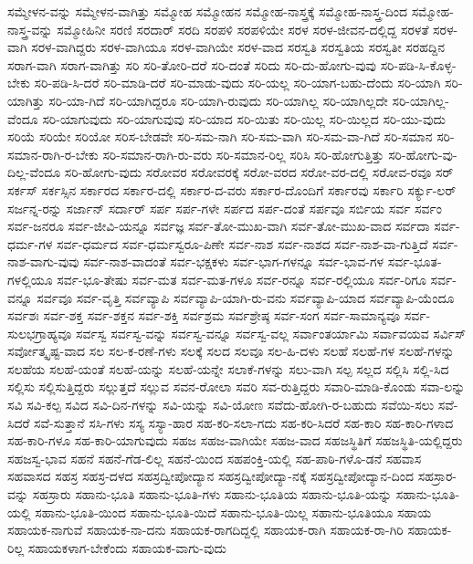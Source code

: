 {ಸಮ್ಮೇಳನ-ವನ್ನು
ಸಮ್ಮೇಳನ-ವಾಗಿತ್ತು
ಸಮ್ಮೋಹ
ಸಮ್ಮೋಹನ
ಸಮ್ಮೋಹ-ನಾಸ್ತ್ರಕ್ಕೆ
ಸಮ್ಮೋಹ-ನಾಸ್ತ್ರ-ದಿಂದ
ಸಮ್ಮೋಹ-ನಾಸ್ತ್ರ-ವನ್ನು
ಸಮ್ಮೋಹಿನೀ
ಸರಣಿ
ಸರದಾರ್
ಸರದಿ
ಸರಪಳಿ
ಸರಪಳಿಯೇ
ಸರಳ
ಸರಳ-ಜೀವನ-ದಲ್ಲಿದ್ದ
ಸರಳತೆ
ಸರಳ-ವಾಗಿ
ಸರಳ-ವಾಗಿದ್ದರು
ಸರಳ-ವಾಗಿಯೂ
ಸರಳ-ವಾಗಿಯೇ
ಸರಳ-ವಾದ
ಸರಸ್ವತಿ
ಸರಸ್ವತಿಯ
ಸರಸ್ವತೀ
ಸರಹದ್ದಿನ
ಸರಾಗ-ವಾಗಿ
ಸರಾಗ-ವಾಗಿತ್ತು
ಸರಿ
ಸರಿ-ತೋರಿ-ದರೆ
ಸರಿ-ದಂತೆ
ಸರಿದು
ಸರಿ-ದು-ಹೋಗು-ವುವು
ಸರಿ-ಪಡಿ-ಸಿ-ಕೊಳ್ಳ-ಬೇಕು
ಸರಿ-ಪಡಿ-ಸಿ-ದರೆ
ಸರಿ-ಮಾಡಿ-ದರೆ
ಸರಿ-ಮಾಡು-ವುದು
ಸರಿ-ಯಲ್ಲ
ಸರಿ-ಯಾಗ-ಬಹು-ದೆಂದು
ಸರಿ-ಯಾಗಿ
ಸರಿ-ಯಾಗಿತ್ತು
ಸರಿ-ಯಾ-ಗಿದೆ
ಸರಿ-ಯಾಗಿದ್ದರೂ
ಸರಿ-ಯಾಗಿ-ರುವುದು
ಸರಿ-ಯಾಗಿಲ್ಲ
ಸರಿ-ಯಾಗಿಲ್ಲದೇ
ಸರಿ-ಯಾಗಿಲ್ಲ-ವೆಂದೂ
ಸರಿ-ಯಾಗುವುದು
ಸರಿ-ಯಾಗುವುವು
ಸರಿ-ಯಾದ
ಸರಿ-ಯಿತು
ಸರಿ-ಯಿಲ್ಲ
ಸರಿ-ಯಿಲ್ಲದ
ಸರಿ-ಯು-ವುದು
ಸರಿಯೆ
ಸರಿಯೇ
ಸರಿಯೋ
ಸರಿಸ-ಬೇಡವೇ
ಸರಿ-ಸಮ-ನಾಗಿ
ಸರಿ-ಸಮ-ವಾಗಿ
ಸರಿ-ಸಮ-ವಾ-ಗಿದೆ
ಸರಿ-ಸಮಾನ
ಸರಿ-ಸಮಾನ-ರಾಗಿ-ರ-ಬೇಕು
ಸರಿ-ಸಮಾನ-ರಾಗಿ-ರು-ವರು
ಸರಿ-ಸಮಾನ-ರಿಲ್ಲ
ಸರಿಸಿ
ಸರಿ-ಹೋಗುತ್ತಿತ್ತು
ಸರಿ-ಹೋಗು-ವು-ದಿಲ್ಲ-ವೆಂದೂ
ಸರಿ-ಹೋಗು-ವುದು
ಸರೋವರ
ಸರೋವರಕ್ಕೆ
ಸರೋ-ವರದ
ಸರೋ-ವರ-ದಲ್ಲಿ
ಸರೋವ-ರವೂ
ಸರ್
ಸರ್ಕಸ್
ಸರ್ಕಸ್ಸಿನ
ಸರ್ಕಾರದ
ಸರ್ಕಾರ-ದಲ್ಲಿ
ಸರ್ಕಾರ-ದ-ವರು
ಸರ್ಕಾರ-ದೊಂದಿಗೆ
ಸರ್ಕಾರವು
ಸರ್ಕಾರಿ
ಸರ್ಕ್ಯು-ಲರ್
ಸರ್ಜನ್ನ-ರನ್ನು
ಸರ್ಜಾನ್
ಸರ್ದಾರ್
ಸರ್ಪ
ಸರ್ಪ-ಗಳೇ
ಸರ್ಪದ
ಸರ್ಪ-ದಂತೆ
ಸರ್ಪವೂ
ಸರ್ಬಿಯ
ಸರ್ವ
ಸರ್ವಂ
ಸರ್ವ-ಜನರೂ
ಸರ್ವ-ಜೀವಿ-ಯನ್ನೂ
ಸರ್ವಜ್ಞ
ಸರ್ವ-ತೋ-ಮುಖ-ವಾಗಿ
ಸರ್ವ-ತೋ-ಮುಖ-ವಾದ
ಸರ್ವದಾ
ಸರ್ವ-ಧರ್ಮ-ಗಳ
ಸರ್ವ-ಧರ್ಮದ
ಸರ್ವ-ಧರ್ಮಸ್ವರೂ-ಪಿಣೇ
ಸರ್ವ-ನಾಶ
ಸರ್ವ-ನಾಶದ
ಸರ್ವ-ನಾಶ-ವಾ-ಗುತ್ತಿದೆ
ಸರ್ವ-ನಾಶ-ವಾಗು-ವುವು
ಸರ್ವ-ನಾಶ-ವಾದಂತೆ
ಸರ್ವ-ಭಕ್ಷಕಳು
ಸರ್ವ-ಭಾಗ-ಗಳನ್ನೂ
ಸರ್ವ-ಭಾವ-ಗಳ
ಸರ್ವ-ಭೂತ-ಗಳಲ್ಲಿಯೂ
ಸರ್ವ-ಭೂ-ತೇಷು
ಸರ್ವ-ಮತ
ಸರ್ವ-ಮತ-ಗಳೂ
ಸರ್ವ-ರನ್ನೂ
ಸರ್ವ-ರಲ್ಲಿಯೂ
ಸರ್ವ-ರಿಗೂ
ಸರ್ವ-ವನ್ನೂ
ಸರ್ವವೂ
ಸರ್ವ-ವೃತ್ತಿ
ಸರ್ವವ್ಯಾಪಿ
ಸರ್ವವ್ಯಾಪಿ-ಯಾಗಿ-ರು-ವನು
ಸರ್ವವ್ಯಾಪಿ-ಯಾದ
ಸರ್ವವ್ಯಾಪಿ-ಯೆಂದೂ
ಸರ್ವಶಃ
ಸರ್ವ-ಶಕ್ತ
ಸರ್ವ-ಶಕ್ತನ
ಸರ್ವ-ಶಕ್ತಿ
ಸರ್ವಶ್ರಮ
ಸರ್ವಶ್ರೇಷ್ಠ
ಸರ್ವ-ಸಂಗ
ಸರ್ವ-ಸಾಮಾನ್ಯವೂ
ಸರ್ವ-ಸುಲಭಗ್ರಾಹ್ಯವೂ
ಸರ್ವಸ್ವ
ಸರ್ವಸ್ವ-ವನ್ನು
ಸರ್ವಸ್ವ-ವನ್ನೂ
ಸರ್ವಸ್ವ-ವಲ್ಲ
ಸರ್ವಾಂತರ್ಯಾಮಿ
ಸರ್ವಾವಯವ
ಸರ್ವಿಸ್
ಸರ್ವೋತ್ಕೃಷ್ಟ-ವಾದ
ಸಲ
ಸಲ-ಕ-ರಣೆ-ಗಳು
ಸಲಕ್ಕೆ
ಸಲದ
ಸಲವೂ
ಸಲ-ಹಿ-ದಳು
ಸಲಹೆ
ಸಲಹೆ-ಗಳ
ಸಲಹೆ-ಗಳನ್ನು
ಸಲಹೆಯ
ಸಲಹೆ-ಯಂತೆ
ಸಲಹೆ-ಯನ್ನು
ಸಲಹೆ-ಯನ್ನೇ
ಸಲಾಕೆ-ಗಳನ್ನು
ಸಲು-ವಾಗಿ
ಸಲ್ಪ
ಸಲ್ಲದ
ಸಲ್ಲಿಸಿ
ಸಲ್ಲಿ-ಸಿದ
ಸಲ್ಲಿಸು
ಸಲ್ಲಿಸುತ್ತಿದ್ದರು
ಸಲ್ಲುತ್ತದೆ
ಸಲ್ಲುವ
ಸವನ-ರೋಲಾ
ಸವರಿ
ಸವ-ರುತ್ತಿದ್ದರು
ಸವಾರಿ-ಮಾಡಿ-ಕೊಂಡು
ಸವಾ-ಲನ್ನು
ಸವಿ
ಸವಿ-ಕಲ್ಪ
ಸವಿದ
ಸವಿ-ದಿನ-ಗಳನ್ನು
ಸವಿ-ಯನ್ನು
ಸವಿ-ಯೋಣ
ಸವೆದು-ಹೋಗಿ-ರ-ಬಹುದು
ಸವೆಯಿ-ಸಲು
ಸವೆ-ಸಿದರೆ
ಸವೆ-ಸುತ್ತಾನೆ
ಸಸಿ-ಗಳು
ಸಸ್ಯ
ಸಸ್ಯಾ-ಹಾರ
ಸಹ-ಕರಿ-ಸಲಾ-ಗದು
ಸಹ-ಕರಿ-ಸಿದರೆ
ಸಹ-ಕಾರಿ
ಸಹ-ಕಾರಿ-ಗಳಾದ
ಸಹ-ಕಾರಿ-ಗಳೂ
ಸಹ-ಕಾರಿ-ಯಾಗುವುದು
ಸಹಜ
ಸಹಜ-ವಾಗಿಯೇ
ಸಹಜ-ವಾದ
ಸಹಜಸ್ಥಿತಿಗೆ
ಸಹಜಸ್ಥಿತಿ-ಯಲ್ಲಿದ್ದರು
ಸಹಜಸ್ವ-ಭಾವ
ಸಹನೆ
ಸಹನೆ-ಗೆಡ-ಲಿಲ್ಲ
ಸಹನೆ-ಯಿಂದ
ಸಹಪಂಕ್ತಿ-ಯಲ್ಲಿ
ಸಹ-ಪಾಠಿ-ಗಳೊ-ಡನೆ
ಸಹವಾಸ
ಸಹವಾಸದ
ಸಹಸ್ರ
ಸಹಸ್ರ-ದಳದ
ಸಹಸ್ರದ್ವೀಪೋದ್ಯಾನ
ಸಹಸ್ರದ್ವೀಪೋದ್ಯಾ-ನಕ್ಕೆ
ಸಹಸ್ರದ್ವೀಪೋದ್ಯಾನ-ದಿಂದ
ಸಹಸ್ರಾರ-ವನ್ನು
ಸಹಸ್ರಾರು
ಸಹಾನು-ಭೂತಿ
ಸಹಾನು-ಭೂತಿ-ಗಳು
ಸಹಾನು-ಭೂತಿಯ
ಸಹಾನು-ಭೂತಿ-ಯನ್ನು
ಸಹಾನು-ಭೂತಿ-ಯಲ್ಲಿ
ಸಹಾನು-ಭೂತಿ-ಯಿಂದ
ಸಹಾನು-ಭೂತಿ-ಯಿದೆ
ಸಹಾನು-ಭೂತಿ-ಯಿಲ್ಲ
ಸಹಾನು-ಭೂತಿಯೂ
ಸಹಾಯ
ಸಹಾಯಕ-ನಾಗುವೆ
ಸಹಾಯಕ-ನಾ-ದನು
ಸಹಾಯಕ-ರಾಗದಿದ್ದಲ್ಲಿ
ಸಹಾಯಕ-ರಾಗಿ
ಸಹಾಯಕ-ರಾ-ಗಿರಿ
ಸಹಾಯಕ-ರಿಲ್ಲ
ಸಹಾಯಕಳಾಗ-ಬೇಕೆಂದು
ಸಹಾಯಕ-ವಾಗು-ವುದು
}
